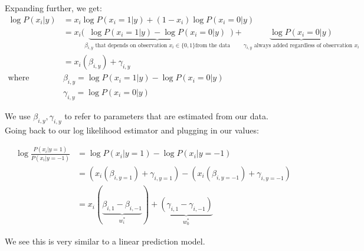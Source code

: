 \begin{itemize}
Expanding further, we get:
\begin{align*}
\log P(x_{i}|y)& =x_i\log P(x_i=1|y)+(1-x_i)\log P(x_i=0|y)  \\
&=x_{i}\bigg(\underbrace{\log P(x_{i}=1|y)-\log P(x_{i}=0|y)}_{\beta_{i,y} \text{ that depends on observation } x_i \in \{0,1\} \text{from the data}}\bigg)+\underbrace{\log P(x_{i}=0|y)}_{\gamma_{i,y} \text{ always added regardless of observation $x_i$}}\\
&= x_i(\beta_{i,y}) + \gamma_{i,y} \\
\text{where }& \beta_{i,y} = \log P(x_{i}=1|y)-\log P(x_{i}=0|y)\\
& \gamma_{i,y}=\log P(x_{i}=0|y)
\end{align*}

We use $\beta_{i,y}, \gamma_{i,y}$ to refer to parameters that are estimated from our data. \\

Going back to our log likelihood estimator and plugging in our values:

\begin{align*}
\log{\frac{P(x_{i}|y=1)}{P(x_{i}|y=-1)}}& =\log P(x_i|y=1)-\log P(x_i|y=-1)  \\
&= (x_i(\beta_{i,y=1}) + \gamma_{i, y=1}) - (x_i(\beta_{i,y=-1}) + \gamma_{i, y=-1})\\
&=x_{i}(\underbrace{\beta_{i,1}-\beta_{i,-1}}_{w_{i}^{*}})+\underbrace{(\gamma_{i,1}-\gamma_{i,-1})}_{w_0^*}
\end{align*}

We see this is very similar to a linear prediction model.
\end{itemize}

